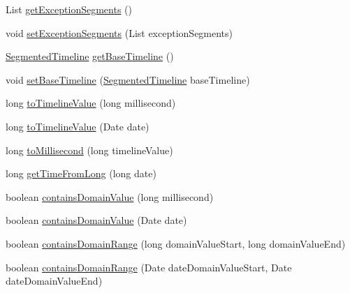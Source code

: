 \begin{DoxyCompactItemize}
\item 
List \mbox{\hyperlink{classorg_1_1jfree_1_1chart_1_1axis_1_1_segmented_timeline_a8f4d42ab1360a4a91287aa732f5922f6}{get\+Exception\+Segments}} ()
\item 
void \mbox{\hyperlink{classorg_1_1jfree_1_1chart_1_1axis_1_1_segmented_timeline_aae8d86befd680b576e5c4376193c06d3}{set\+Exception\+Segments}} (List exception\+Segments)
\item 
\mbox{\hyperlink{classorg_1_1jfree_1_1chart_1_1axis_1_1_segmented_timeline}{Segmented\+Timeline}} \mbox{\hyperlink{classorg_1_1jfree_1_1chart_1_1axis_1_1_segmented_timeline_a69be88713c3564e7624fa2769ffefef1}{get\+Base\+Timeline}} ()
\item 
void \mbox{\hyperlink{classorg_1_1jfree_1_1chart_1_1axis_1_1_segmented_timeline_a2780e1604c8b8eadb55056b2b00b50f8}{set\+Base\+Timeline}} (\mbox{\hyperlink{classorg_1_1jfree_1_1chart_1_1axis_1_1_segmented_timeline}{Segmented\+Timeline}} base\+Timeline)
\item 
long \mbox{\hyperlink{classorg_1_1jfree_1_1chart_1_1axis_1_1_segmented_timeline_adade2f77808e594498067a2b70a6099e}{to\+Timeline\+Value}} (long millisecond)
\item 
long \mbox{\hyperlink{classorg_1_1jfree_1_1chart_1_1axis_1_1_segmented_timeline_a9ceca997773324de3d7164b023c1c0e0}{to\+Timeline\+Value}} (Date date)
\item 
long \mbox{\hyperlink{classorg_1_1jfree_1_1chart_1_1axis_1_1_segmented_timeline_a734fc49f503e38b51902dbee8f27c060}{to\+Millisecond}} (long timeline\+Value)
\item 
long \mbox{\hyperlink{classorg_1_1jfree_1_1chart_1_1axis_1_1_segmented_timeline_aafeaa7cc2799e7b0baec67bf86489b62}{get\+Time\+From\+Long}} (long date)
\item 
boolean \mbox{\hyperlink{classorg_1_1jfree_1_1chart_1_1axis_1_1_segmented_timeline_aac440eed1b4484e0092a4bb041ef460c}{contains\+Domain\+Value}} (long millisecond)
\item 
boolean \mbox{\hyperlink{classorg_1_1jfree_1_1chart_1_1axis_1_1_segmented_timeline_a36df47cbf970d1268f96686da04bc199}{contains\+Domain\+Value}} (Date date)
\item 
boolean \mbox{\hyperlink{classorg_1_1jfree_1_1chart_1_1axis_1_1_segmented_timeline_afd857a016b41d3169350c0e506382f6e}{contains\+Domain\+Range}} (long domain\+Value\+Start, long domain\+Value\+End)
\item 
boolean \mbox{\hyperlink{classorg_1_1jfree_1_1chart_1_1axis_1_1_segmented_timeline_a71800b05e06d6011fcff21df388e1b63}{contains\+Domain\+Range}} (Date date\+Domain\+Value\+Start, Date date\+Domain\+Value\+End)

\end{DoxyCompactItemize}
